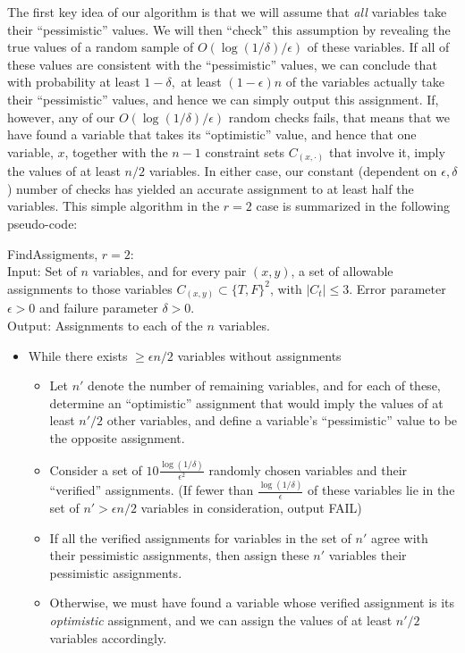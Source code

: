 \documentclass[final,12pt]{colt2018}
\newcommand{\eps}{\epsilon}
\begin{document}
The first key idea of our algorithm is that we will assume that \emph{all} variables take their ``pessimistic'' values.   We will then ``check'' this assumption by revealing the true values of a random sample of $O(\log(1/\delta)/\eps)$ of these variables.  If all of these values are consistent with the ``pessimistic'' values, we can conclude that with probability at least $1-\delta,$ at least $(1-\eps) n$ of the variables actually take their ``pessimistic'' values, and hence we can simply output this assignment.   If, however, any of our $O(\log(1/\delta)/\eps)$ random checks fails, that means that we have found a variable that takes its ``optimistic'' value, and hence that one variable, $x$, together with the $n-1$ constraint sets $C_{(x,\cdot)}$ that involve it, imply the values of at least $n/2$ variables.  In either case, our constant (dependent on $\eps,\delta$) number of checks has yielded an accurate assignment to at least half the variables.  This simple algorithm in the $r=2$ case is summarized in the following pseudo-code:


\begin{algorithm}[H]
FindAssigments, $r=2$:\\
Input: Set of $n$ variables, and for every pair $(x,y)$, a set of allowable assignments to those variables $C_{(x,y)} \subset \{T,F\}^{2}$, with $|C_t| \le 3.$  Error parameter $\eps>0$ and failure parameter $\delta> 0$.\\
Output: Assignments to each of the $n$ variables.
\begin{itemize}
\item While there exists $\ge \eps n/2$ variables without assignments
\begin{itemize}
\item Let $n'$ denote the number of remaining variables, and for each of these, determine an ``optimistic'' assignment that would imply the values of at least $n'/2$ other variables, and define a variable's ``pessimistic'' value to be the opposite assignment. 
\item Consider a set of $10\frac{\log(1/\delta)}{\eps^2}$ randomly chosen variables and their ``verified'' assignments.  (If fewer than $\frac{\log(1/\delta)}{\eps}$ of these variables lie in the set of $n' > \eps n/2$ variables in consideration, output FAIL)
\item If all the verified assignments for variables in the set of $n'$ agree with their pessimistic assignments, then assign these $n'$ variables their pessimistic assignments.
\item Otherwise, we must have found a variable whose verified assignment is its \emph{optimistic} assignment, and we can assign the values of at least $n'/2$ variables accordingly.
\end{itemize}
\end{itemize}
\end{algorithm}
\end{document}

